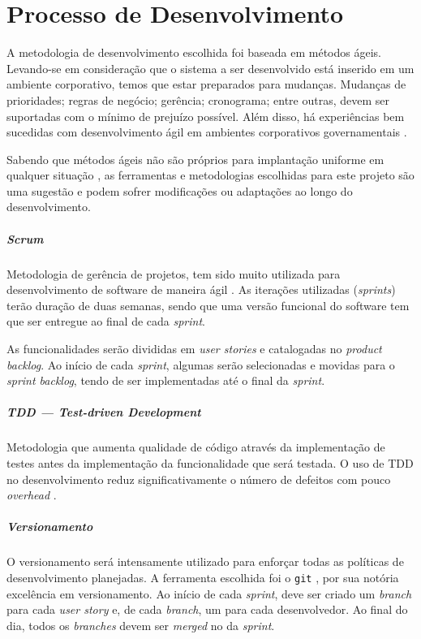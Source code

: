 \documentclass[12pt,a4paper]{report}
\begin{document}
\chapter{Processo de Desenvolvimento}

A metodologia de desenvolvimento escolhida foi baseada em métodos ágeis. Levando-se em consideração que o sistema a ser desenvolvido está inserido em um ambiente corporativo, temos que estar preparados para mudanças. Mudanças de prioridades; regras de negócio; gerência; cronograma; entre outras, devem ser suportadas com o mínimo de prejuízo possível. Além disso, há experiências bem sucedidas com desenvolvimento ágil em ambientes corporativos governamentais \cite{metaginstpub}.

Sabendo que métodos ágeis não são próprios para implantação uniforme em qualquer situação \cite{cohn2009succeeding}, as ferramentas e metodologias escolhidas para este projeto são uma sugestão e podem sofrer modificações ou adaptações ao longo do desenvolvimento.

\paragraph{Scrum} Metodologia de gerência de projetos, tem sido muito utilizada para desenvolvimento de software de maneira ágil \cite{854065}. As iterações utilizadas (\textit{sprints}) terão duração de duas semanas, sendo que uma versão funcional do software tem que ser entregue ao final de cada \textit{sprint}.

As funcionalidades serão divididas em \textit{user stories} e catalogadas no \textit{product backlog}. Ao início de cada \textit{sprint}, algumas serão selecionadas e movidas para o \textit{sprint backlog}, tendo de ser implementadas até o final da \textit{sprint}.

\paragraph{TDD --- \textit{Test-driven Development}} Metodologia que aumenta qualidade de código através da implementação de testes antes da implementação da funcionalidade que será testada. O uso de TDD no desenvolvimento reduz significativamente o número de defeitos com pouco \textit{overhead} \cite{1201238}.

\paragraph{Versionamento} O versionamento será intensamente utilizado para enforçar todas as políticas de desenvolvimento planejadas. A ferramenta escolhida foi o \texttt{git} \cite{6188603}, por sua notória excelência em versionamento. Ao início de cada \textit{sprint}, deve ser criado um \textit{branch} para cada \textit{user story} e, de cada \textit{branch}, um para cada desenvolvedor. Ao final do dia, todos os \textit{branches} devem ser \textit{merged} no da \textit{sprint}.
\end{document}
